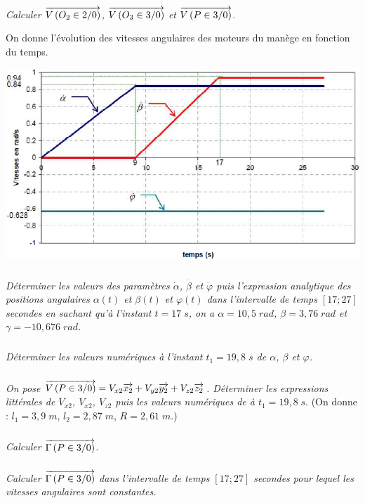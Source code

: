 \documentclass[10pt,oneside]{article}
\begin{document}
\subparagraph{}
\textit{Calculer $\overrightarrow{V\left( {O_2} \in {2}/{0}\right)}$, $\overrightarrow{V\left( {O_3} \in {3}/{0}\right)}$ et $\overrightarrow{V\left( {P} \in {3}/{0}\right)}$.}

\vspace{.3cm}

On donne l'évolution des vitesses angulaires des moteurs du manège en fonction du temps.
\begin{center}
\includegraphics[width=.9\textwidth]{png/img2}
\end{center}

\subparagraph{\label{lab}}
\textit{Déterminer les valeurs des paramètres $\dot{\alpha}$, $\dot{\beta}$ et $\dot{\varphi}$
puis l'expression analytique des positions angulaires $\alpha(t)$ et $\beta(t)$ et $\varphi(t)$ dans l'intervalle de temps $[17;27]$ secondes en sachant qu'à l'instant $t=17\;s$, on a $\alpha=10,5\; rad$, $\beta=3,76\; rad$ et $\gamma=-10,676\; rad$.}

\subparagraph{}
\textit{Déterminer les valeurs numériques à l'instant $t_1=19,8\; s$ de $\alpha$, $\beta$ et $\varphi$.}

\subparagraph{}
\textit{On pose $\overrightarrow{V\left( {P} \in {3}/{0}\right)}=V_{x2}\overrightarrow{x_2}+V_{y2}\overrightarrow{y_2}+V_{z2}\overrightarrow{z_2}$. Déterminer les expressions littérales de $V_{x2}$, $V_{x2}$, $V_{z2}$ puis les valeurs numériques de à $t_1=19,8\;s.$} (On donne : $l_1=3,9\;m$, $l_2=2,87\;m$, $R=2,61\;m$.)

\subparagraph{}
\textit{Calculer $\overrightarrow{\Gamma\left(P\in3/0 \right)}$.}

\subparagraph{}
\textit{Calculer $\overrightarrow{\Gamma\left(P\in3/0 \right)}$ dans l'intervalle de temps $[17;27]$ secondes pour lequel les vitesses angulaires sont constantes.}

\vspace{.3cm}
\end{document}
